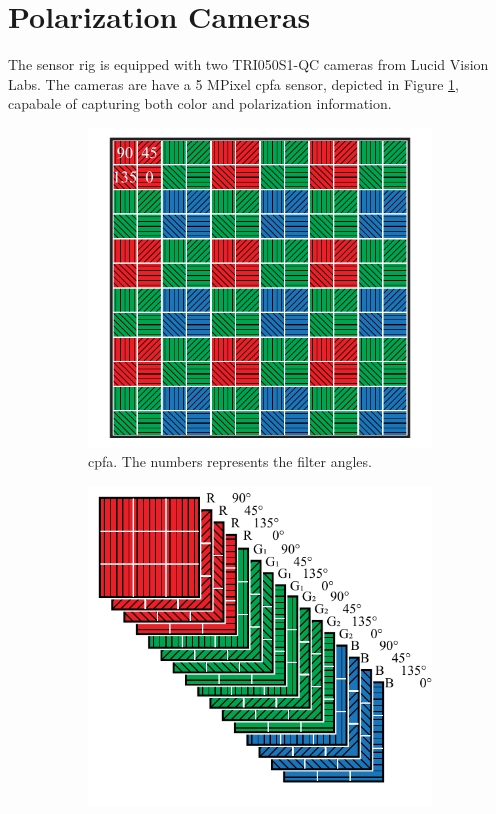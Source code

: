 \section{Polarization Cameras}
The sensor rig is equipped with two TRI050S1-QC cameras from Lucid Vision Labs.
The cameras are have a 5 MPixel \gls{cpfa} sensor, depicted in Figure \ref{fig:cpfa}, capabale of capturing both color and polarization information.

\begin{figure}[H]
    \begin{subfigure}[B]{.48\textwidth}
        \centering
        \includegraphics[width=\textwidth]{figures/sensor_layout.pdf}
        \caption{\gls{cpfa}. The numbers represents the filter angles.\label{fig:cpfa}}
    \end{subfigure}
    \hfill
    \begin{subfigure}[B]{.48\textwidth}
        \includegraphics[width=\textwidth]{figures/sensor_packaging.pdf}

\end{subfigure}
\end{figure}
